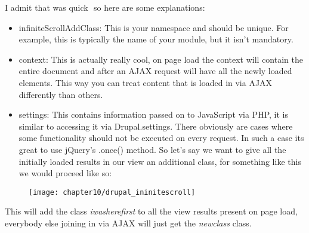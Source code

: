 I admit that was quick ­ so here are some explanations:
\begin{itemize}
	\item infiniteScrollAddClass: This is your namespace and should be unique. For example, this is typically the name of your module, but it isn't mandatory.
	\item context: This is actually really cool, on page load the context will contain the entire document and after an AJAX request will have all the newly loaded elements. This way you can treat content that is loaded in via AJAX differently than others.
	\item settings: This contains information passed on to JavaScript via PHP, it is similar to accessing it via Drupal.settings. There obviously are cases where some functionality should not be executed on every request. In such a case its great to use jQuery's .once() method. So let's say we want to give all the initially loaded results in our view an additional class, for something like this we would proceed like so:
\end{itemize}

\begin{figure}[H]
	\centering
	\texttt{[image: chapter10/drupal\_ininitescroll]}
	\label{fig:drupal_ininitescroll}
\end{figure}

This will add the class \textit{i­was­here­first} to all the view results present on page load, everybody else joining in via AJAX will just get the \textit{new­class} class.




